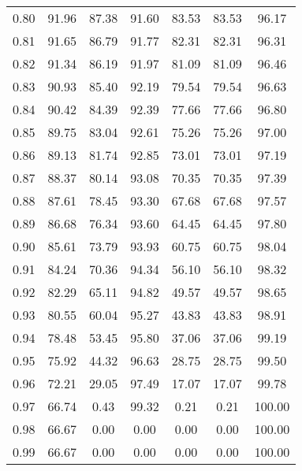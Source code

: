\begin{tabular}{|c|c|c|c|c|c|c|}
      0.80 &     91.96 &     87.38 &      91.60 &   83.53 &      83.53 &         96.17 \\
      0.81 &     91.65 &     86.79 &      91.77 &   82.31 &      82.31 &         96.31 \\
      0.82 &     91.34 &     86.19 &      91.97 &   81.09 &      81.09 &         96.46 \\
      0.83 &     90.93 &     85.40 &      92.19 &   79.54 &      79.54 &         96.63 \\
      0.84 &     90.42 &     84.39 &      92.39 &   77.66 &      77.66 &         96.80 \\
      0.85 &     89.75 &     83.04 &      92.61 &   75.26 &      75.26 &         97.00 \\
      0.86 &     89.13 &     81.74 &      92.85 &   73.01 &      73.01 &         97.19 \\
      0.87 &     88.37 &     80.14 &      93.08 &   70.35 &      70.35 &         97.39 \\
      0.88 &     87.61 &     78.45 &      93.30 &   67.68 &      67.68 &         97.57 \\
      0.89 &     86.68 &     76.34 &      93.60 &   64.45 &      64.45 &         97.80 \\
      0.90 &     85.61 &     73.79 &      93.93 &   60.75 &      60.75 &         98.04 \\
      0.91 &     84.24 &     70.36 &      94.34 &   56.10 &      56.10 &         98.32 \\
      0.92 &     82.29 &     65.11 &      94.82 &   49.57 &      49.57 &         98.65 \\
      0.93 &     80.55 &     60.04 &      95.27 &   43.83 &      43.83 &         98.91 \\
      0.94 &     78.48 &     53.45 &      95.80 &   37.06 &      37.06 &         99.19 \\
      0.95 &     75.92 &     44.32 &      96.63 &   28.75 &      28.75 &         99.50 \\
      0.96 &     72.21 &     29.05 &      97.49 &   17.07 &      17.07 &         99.78 \\
      0.97 &     66.74 &      0.43 &      99.32 &    0.21 &       0.21 &        100.00 \\
      0.98 &     66.67 &      0.00 &       0.00 &    0.00 &       0.00 &        100.00 \\
      0.99 &     66.67 &      0.00 &       0.00 &    0.00 &       0.00 &        100.00 \\
\bottomrule
\end{tabular}
